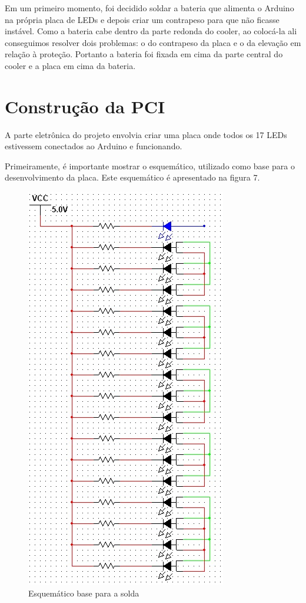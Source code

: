 Em um primeiro momento, foi decidido soldar a bateria que alimenta o Arduino na própria placa de LEDs e depois criar um contrapeso para que não ficasse instável. Como a bateria cabe dentro da parte redonda do cooler, ao colocá-la ali conseguimos resolver dois problemas: o do contrapeso da placa e o da elevação em relação à proteção. Portanto a bateria foi fixada em cima da parte central do cooler e a placa em cima da bateria.

\section{Construção da PCI}
A  parte eletrônica do projeto envolvia criar uma placa onde todos os 17 LEDs estivessem conectados ao Arduino e funcionando.

Primeiramente, é importante mostrar o esquemático, utilizado como base para o desenvolvimento da placa. Este esquemático é apresentado na figura 7.

\begin{figure}[!h]
	\centering
	\includegraphics{./esquematico.jpg}
	\caption[Esquemático base para a solda]{Esquemático base para a solda}
	\label{fig:esquematico}
\end{figure}


